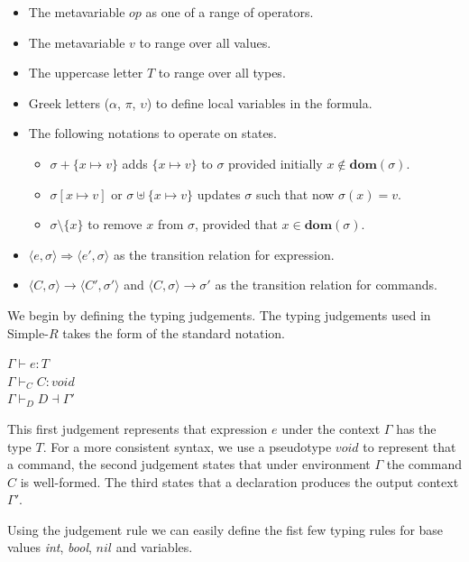 \documentclass[a4paper,12pt]{report}
\begin{document}
\renewcommand\labelitemii{$\blacksquare$}
\begin{itemize}
  \item The metavariable $op$ as one of a range of operators. 
  \item The metavariable $v$ to range over all values.
  \item The uppercase letter $T$ to range over all types.
  \item Greek letters ($\alpha$, $\pi$, $\upsilon$) to define local variables in 
  the formula. 
  \item The following notations to operate on states. 
    \begin{itemize}
      \item $\sigma + \{x \mapsto v\}$ adds $\{x \mapsto v\}$ to $\sigma$ provided initially $x \notin\textbf{dom}(\sigma)$. 
      \item $\sigma[x \mapsto v]$ or $\sigma \uplus \{x \mapsto v\}$ updates $\sigma$ such that now $\sigma(x) = v$.
      \item $\sigma \setminus \{x\}$ to remove $x$ from $\sigma$, provided that $x \in \textbf{dom}(\sigma)$.
    \end{itemize}
  \item $\langle e, \sigma \rangle \Longrightarrow \langle e', \sigma \rangle$ as the transition relation for expression.
  \item $\langle C, \sigma \rangle \longrightarrow \langle C', \sigma' \rangle$ and $\langle C, \sigma \rangle \longrightarrow \sigma'$ as the transition relation for commands.
\end{itemize}

\par
We begin by defining the typing judgements. The typing judgements used in 
Simple-$R$ takes the form of the standard notation. 
\begin{center}
  $\Gamma \vdash e : T$\\
  $\Gamma \vdash_{C} C : void$\\
  $\Gamma \vdash_{D} D \dashv \Gamma'$\\
\end{center}
This first judgement represents that expression $e$ 
under the context $\Gamma$ has the type $T$. For a more consistent syntax, 
we use a pseudotype $void$ to represent that a command, the second judgement 
states that under environment $\Gamma$ the command $C$ is well-formed. 
The third states that a declaration produces the output context $\Gamma'$. 

\par
Using the judgement rule we can easily define the fist few typing rules for base 
values \textit{int}, \textit{bool}, $nil$ and variables.
\end{document}
